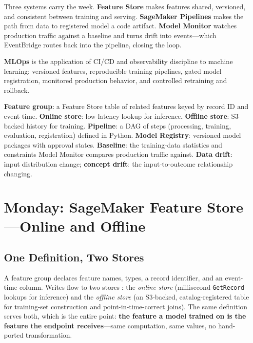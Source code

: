 Three systems carry the week. \textbf{Feature Store} makes features shared, versioned, and consistent between training and serving. \textbf{SageMaker Pipelines} makes the path from data to registered model a code artifact. \textbf{Model Monitor} watches production traffic against a baseline and turns drift into events---which EventBridge routes back into the pipeline, closing the loop.

\begin{definitionbox}
\textbf{MLOps} is the application of CI/CD and observability discipline to machine learning: versioned features, reproducible training pipelines, gated model registration, monitored production behavior, and controlled retraining and rollback.
\end{definitionbox}

\begin{keyterms}
\textbf{Feature group}: a Feature Store table of related features keyed by record ID and event time. \textbf{Online store}: low-latency lookup for inference. \textbf{Offline store}: S3-backed history for training. \textbf{Pipeline}: a DAG of steps (processing, training, evaluation, registration) defined in Python. \textbf{Model Registry}: versioned model packages with approval states. \textbf{Baseline}: the training-data statistics and constraints Model Monitor compares production traffic against. \textbf{Data drift}: input distribution change; \textbf{concept drift}: the input-to-outcome relationship changing.
\end{keyterms}

\section{Monday: SageMaker Feature Store---Online and Offline}
\subsection{One Definition, Two Stores}
A feature group declares feature names, types, a record identifier, and an event-time column. Writes flow to two stores \cite{awsFeatureStoreDocs}: the \emph{online store} (millisecond \texttt{GetRecord} lookups for inference) and the \emph{offline store} (an S3-backed, catalog-registered table for training-set construction and point-in-time-correct joins). The same definition serves both, which is the entire point: \textbf{the feature a model trained on is the feature the endpoint receives}---same computation, same values, no hand-ported transformation.

